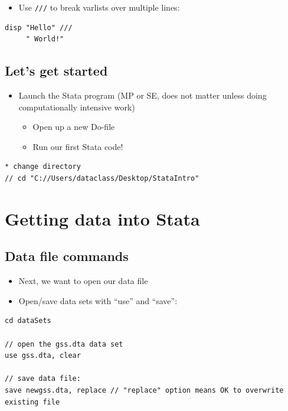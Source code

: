 \documentclass[]{book}
\providecommand{\tightlist}{%
  \setlength{\itemsep}{0pt}\setlength{\parskip}{0pt}}
\begin{document}
\begin{itemize}
\tightlist
\item
  Use \texttt{///} to break varlists over multiple lines:
\end{itemize}

\begin{verbatim}
disp "Hello" ///
     " World!"
\end{verbatim}

\subsection{Let's get started}\label{lets-get-started}

\begin{itemize}
\tightlist
\item
  Launch the Stata program (MP or SE, does not matter unless doing
  computationally intensive work)

  \begin{itemize}
  \tightlist
  \item
    Open up a new Do-file
  \item
    Run our first Stata code!
  \end{itemize}
\end{itemize}

\begin{verbatim}
* change directory
// cd "C://Users/dataclass/Desktop/StataIntro"
\end{verbatim}

\section{Getting data into Stata}\label{getting-data-into-stata}

\subsection{Data file commands}\label{data-file-commands}

\begin{itemize}
\tightlist
\item
  Next, we want to open our data file
\item
  Open/save data sets with ``use'' and ``save'':
\end{itemize}

\begin{verbatim}
cd dataSets

// open the gss.dta data set
use gss.dta, clear

// save data file:
save newgss.dta, replace // "replace" option means OK to overwrite existing file
\end{verbatim}
\end{document}
